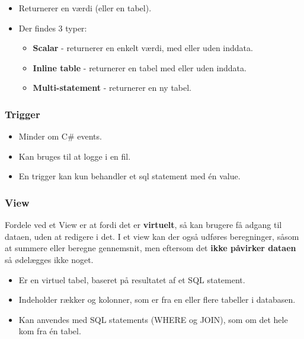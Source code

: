 \begin{itemize}
	\item Returnerer en værdi (eller en tabel).
	\item Der findes 3 typer:
	
	\begin{itemize}
		\item \textbf{Scalar} - returnerer en enkelt værdi, med eller uden inddata.
		\item \textbf{Inline table} - returnerer en tabel med eller uden inddata.
		\item \textbf{Multi-statement} - returnerer en ny tabel.
	\end{itemize}
\end{itemize}

\subsubsection{Trigger}

\begin{itemize}
	\item Minder om C\# events.
	\item Kan bruges til at logge i en fil. %
	\item En trigger kan kun behandler et sql statement med én value.
\end{itemize}

\subsubsection{View}
 Fordele ved et View er at fordi det er \textbf{virtuelt}, så kan brugere få adgang til dataen, uden at redigere i det. I et view kan der også udføres beregninger, såsom at summere eller beregne gennemsnit, men eftersom det \textbf{ikke påvirker dataen} så ødelægges ikke noget.

\begin{itemize}
	\item Er en virtuel tabel, baseret på resultatet af et SQL statement.
	\item Indeholder rækker og kolonner, som er fra en eller flere tabeller i databasen.
	\item Kan anvendes med SQL statements (WHERE og JOIN), som om det hele kom fra én tabel.
\end{itemize}

